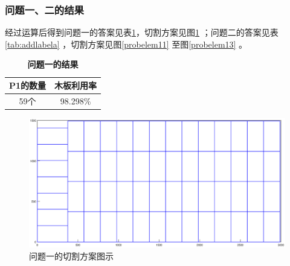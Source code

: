 \documentclass[hyperref,UTF8]{article}
\begin{document}
{\subsubsection{问题一、二的结果}
经过运算后得到问题一的答案见表\ref{tab:P11}，切割方案见图\ref{probelem1}
；问题二的答案见表\ref{tab:addlabela}
，切割方案见图\ref{probelem11}
至图\ref{probelem13}
。
\begin{table}[htbp]
  \centering
  \caption{\textbf{问题一的结果}}
    \begin{tabular}{|c|c|}
    \hline
    P1的数量 & 木板利用率 \\\hline
    59个 & 98.298\% \\\hline
    \end{tabular}%
  \label{tab:P11}%
\end{table}%
\begin{figure}[htbp]
  \centering
  \includegraphics[width=\textwidth]{picture/problem1}
  \caption{问题一的切割方案图示}\label{probelem1}
\end{figure}

}
\end{document}
